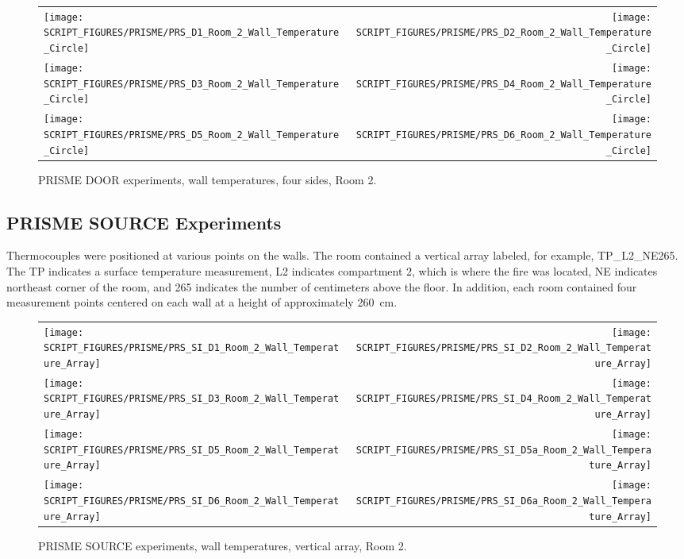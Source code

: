 \begin{figure}[p]
\begin{tabular*}{\textwidth}{l@{\extracolsep{\fill}}r}
\texttt{[image: SCRIPT\_FIGURES/PRISME/PRS\_D1\_Room\_2\_Wall\_Temperature\_Circle]} &
\texttt{[image: SCRIPT\_FIGURES/PRISME/PRS\_D2\_Room\_2\_Wall\_Temperature\_Circle]} \\
\texttt{[image: SCRIPT\_FIGURES/PRISME/PRS\_D3\_Room\_2\_Wall\_Temperature\_Circle]} &
\texttt{[image: SCRIPT\_FIGURES/PRISME/PRS\_D4\_Room\_2\_Wall\_Temperature\_Circle]} \\
\texttt{[image: SCRIPT\_FIGURES/PRISME/PRS\_D5\_Room\_2\_Wall\_Temperature\_Circle]} &
\texttt{[image: SCRIPT\_FIGURES/PRISME/PRS\_D6\_Room\_2\_Wall\_Temperature\_Circle]}
\end{tabular*}
\caption[PRISME DOOR experiments, wall temperatures, four sides, Room 2]{PRISME DOOR experiments, wall temperatures, four sides, Room 2.}
\label{PRISME_Wall_Circle_Room_2}
\end{figure}

\clearpage

\subsection{PRISME SOURCE Experiments}

Thermocouples were positioned at various points on the walls. The room contained a vertical array labeled, for example, TP\_L2\_NE265. The TP indicates a surface temperature measurement, L2 indicates compartment 2, which is where the fire was located, NE indicates northeast corner of the room, and 265 indicates the number of centimeters above the floor. In addition, each room contained four measurement points centered on each wall at a height of approximately 260~cm.

\begin{figure}[!ht]
\begin{tabular*}{\textwidth}{l@{\extracolsep{\fill}}r}
\texttt{[image: SCRIPT\_FIGURES/PRISME/PRS\_SI\_D1\_Room\_2\_Wall\_Temperature\_Array]} &
\texttt{[image: SCRIPT\_FIGURES/PRISME/PRS\_SI\_D2\_Room\_2\_Wall\_Temperature\_Array]} \\
\texttt{[image: SCRIPT\_FIGURES/PRISME/PRS\_SI\_D3\_Room\_2\_Wall\_Temperature\_Array]} &
\texttt{[image: SCRIPT\_FIGURES/PRISME/PRS\_SI\_D4\_Room\_2\_Wall\_Temperature\_Array]} \\
\texttt{[image: SCRIPT\_FIGURES/PRISME/PRS\_SI\_D5\_Room\_2\_Wall\_Temperature\_Array]} &
\texttt{[image: SCRIPT\_FIGURES/PRISME/PRS\_SI\_D5a\_Room\_2\_Wall\_Temperature\_Array]} \\
\texttt{[image: SCRIPT\_FIGURES/PRISME/PRS\_SI\_D6\_Room\_2\_Wall\_Temperature\_Array]} &
\texttt{[image: SCRIPT\_FIGURES/PRISME/PRS\_SI\_D6a\_Room\_2\_Wall\_Temperature\_Array]}
\end{tabular*}
\caption[PRISME SOURCE experiments, wall temperatures, vertical array, Room 2]{PRISME SOURCE experiments, wall temperatures, vertical array, Room 2.}
\label{PRISME_SOURCE_Wall_Array_Room_2}
\end{figure}

